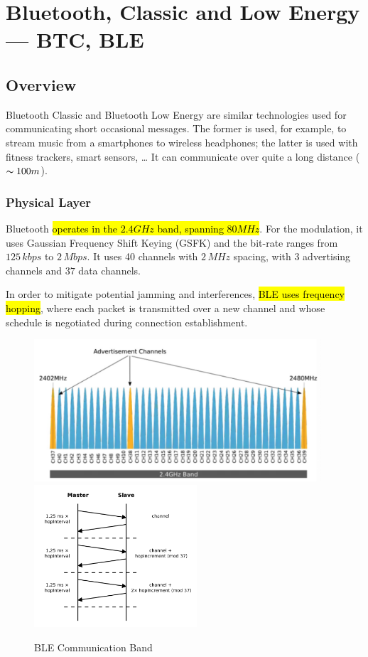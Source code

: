 \section{Bluetooth, Classic and Low Energy --- BTC, BLE}

\subsection{Overview}
Bluetooth Classic and Bluetooth Low Energy are similar technologies used for communicating short occasional messages. The former is used, for example, to stream music from a smartphones to wireless headphones; the latter is used with fitness trackers, smart sensors, \dots
It can communicate over quite a long distance ($\thicksim 100m$).
\subsubsection{Physical Layer}
Bluetooth \hl{operates in the $2.4GHz$ band, spanning $80MHz$}. For the modulation, it uses Gaussian Frequency Shift Keying (GSFK) and the bit-rate ranges from $125\,{kbps}$ to $2\,Mbps$.
It uses 40 channels with $2\,MHz$ spacing, with $3$ advertising channels and $37$ data channels.

In order to mitigate potential jamming and interferences, \hl{BLE uses frequency hopping}, where each packet is transmitted over a new channel and whose schedule is negotiated during connection establishment.

\begin{figure}[h]
	\centering
	\includegraphics[height=5.3cm]{images/11-ble-comm-band.png}
	\includegraphics[height=5.3cm]{images/11-fh.png}
	\caption{BLE Communication Band}
	\label{fig:ble-comm-band}
\end{figure}

